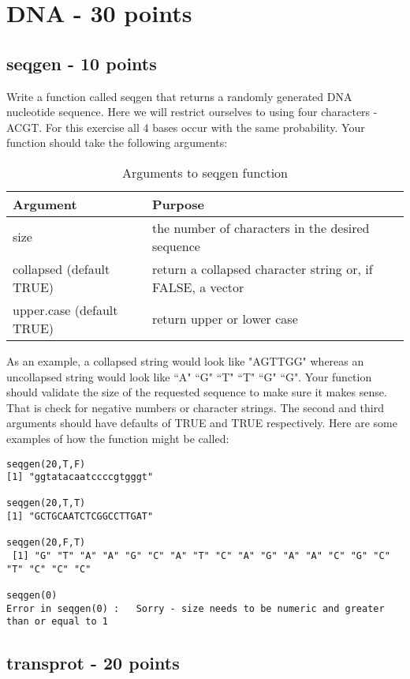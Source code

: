 \documentclass{article}
\begin{document}
\section{DNA - 30 points}

\subsection{seqgen - 10 points}Write a function called seqgen that returns a randomly generated DNA nucleotide sequence. Here we will restrict ourselves to using four characters - ACGT. For this exercise all 4 bases occur with the same probability. Your function should take the following arguments:

\begin{table}[ht]
\caption{Arguments to seqgen function}
\begin{tabular}{l | l}
\hline\hline
Argument & Purpose \\ [1ex]
\hline
size & the number of characters in the desired sequence \\ [1ex]
\hline 
collapsed (default TRUE) & return a collapsed character string or, if FALSE, a vector  \\ [1ex]
\hline
upper.case (default TRUE) & return upper or lower case \\ [1ex]
\end{tabular}
\label{table:nonlin}
\end{table}

As an example, a collapsed string would look like  "AGTTGG" whereas an uncollapsed string would look like ``A" ``G" ``T" ``T" ``G" ``G". Your function should validate the size of the requested sequence to make sure it makes sense. That is check for negative numbers or character strings. The second and third arguments should have defaults of TRUE and TRUE respectively. Here are some examples of how the function might be called:

\begin{verbatim}
seqgen(20,T,F)
[1] "ggtatacaatccccgtgggt"

seqgen(20,T,T)
[1] "GCTGCAATCTCGGCCTTGAT"

seqgen(20,F,T)
 [1] "G" "T" "A" "A" "G" "C" "A" "T" "C" "A" "G" "A" "A" "C" "G" "C" "T" "C" "C" "C"

seqgen(0)
Error in seqgen(0) :   Sorry - size needs to be numeric and greater than or equal to 1

\end{verbatim}

\subsection{transprot - 20 points}
\end{document}

